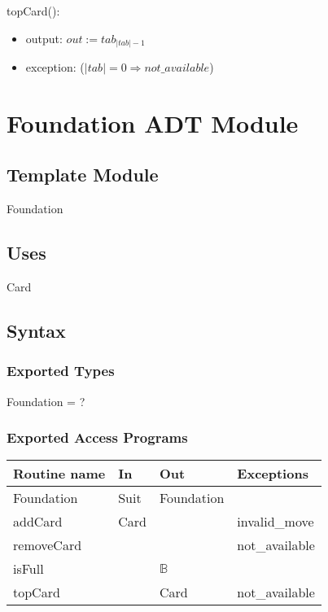 \documentclass[12pt]{article}
\begin{document}
\noindent topCard():
\begin{itemize}
\item output: $out := tab_{|tab|-1}$
\item exception: ($|tab| = 0 \Rightarrow not\_available$)
\end{itemize}

\newpage

\section* {Foundation ADT Module}

\subsection*{Template Module}

Foundation

\subsection* {Uses}

Card

\subsection* {Syntax}

\subsubsection* {Exported Types}

Foundation = ?

\subsubsection* {Exported Access Programs}

\begin{tabular}{| l | l | l | l |}
\hline
\textbf{Routine name} & \textbf{In} & \textbf{Out} & \textbf{Exceptions}\\
\hline
Foundation & Suit & Foundation & \\ 
\hline
addCard & Card  & ~ & invalid\_move\\ 
\hline
removeCard & ~ & &not\_available  \\
\hline
isFull & ~ & $\mathbb{B}$ & ~\\
\hline
topCard & ~ & Card & not\_available\\
\hline
\end{tabular}
\end{document}
